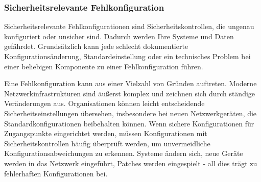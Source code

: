 \subsubsection{Sicherheitsrelevante Fehlkonfiguration}

Sicherheitsrelevante Fehlkonfigurationen sind 
Sicherheitskontrollen, die ungenau konfiguriert oder
unsicher sind. Dadurch werden Ihre Systeme und Daten 
gef\"ahrdet. Grunds\"atzlich kann jede schlecht dokumentierte 
Konfigurations\"anderung, Standardeinstellung oder ein 
technisches Problem bei einer beliebigen Komponente zu 
einer Fehlkonfiguration f\"uhren.

Eine Fehlkonfiguration kann aus einer Vielzahl von 
Gr\"unden auftreten. Moderne Netzwerkinfrastrukturen sind
\"au{\ss}erst komplex und zeichnen sich durch st\"andige
Ver\"anderungen aus. Organisationen k\"onnen leicht 
entscheidende Sicherheitseinstellungen \"ubersehen, 
insbesondere bei neuen Netzwerkger\"aten, die 
Standardkonfigurationen beibehalten k\"onnen. Wenn
sichere Konfigurationen f\"ur Zugangspunkte eingerichtet 
werden, m\"ussen Konfigurationen mit Sicherheitskontrollen
h\"aufig \"uberpr\"uft werden, um unvermeidliche 
Konfigurationsabweichungen zu erkennen. Systeme
\"andern sich, neue Ger\"ate werden in das Netzwerk
eingef\"uhrt, Patches werden eingespielt - all dies
tr\"agt zu fehlerhaften Konfigurationen bei.


